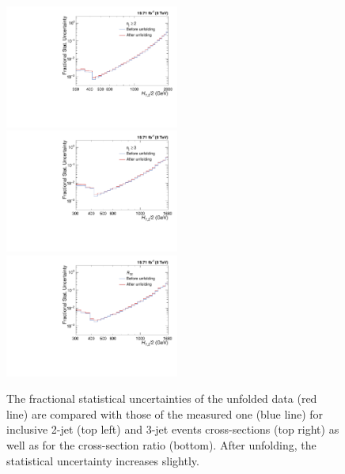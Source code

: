 \begin{figure}[!ht]
 \begin{center}
 \hspace*{-3mm}\includegraphics[width=0.51\textwidth]{Plots_HT_2_150/Comparison_stat_unc_2_HT_2_150.pdf}%
 ~~\includegraphics[width=0.51\textwidth]{Plots_HT_2_150/Comparison_stat_unc_3_HT_2_150.pdf}\\
 \includegraphics[width=0.51\textwidth]{Plots_HT_2_150/Comparison_stat_unc_ratio_32_symm.pdf}
 \caption[The fractional statistical uncertainties of the unfolded data are compared with those of the measured one.]{The fractional statistical uncertainties of the unfolded data (red line) are compared with those of the measured one (blue line) for inclusive 2-jet (top left) and 3-jet events cross-sections (top right) as well as for the cross-section ratio \ratio (bottom). After unfolding, the statistical uncertainty increases slightly.}
 \label{fig:stat_unc}
 \end{center}
\end{figure}


